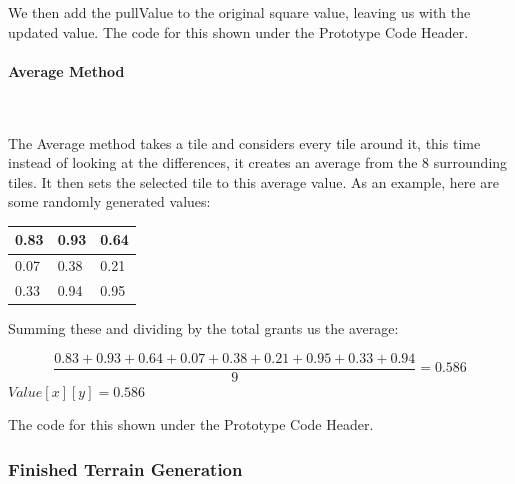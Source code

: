 \begin{flushleft}
            \vspace{0.5cm}

            We then add the pullValue to the original square value, leaving us with the updated value. The code for 
            this shown under the Prototype Code Header.
            \vspace{0.5cm}

            \paragraph{Average Method} \mbox{} \\
            \vspace{0.25cm}

            The Average method takes a tile and considers every tile around it, this time instead of looking at the
            differences, it creates an average from the 8 surrounding tiles. It then sets the selected tile to this
            average value. As an example, here are some randomly generated values:

            \begin{center}
                \begin{tabular}{| C{0.75cm} | C{0.75cm} | C{0.75cm} |}
                     & 0.93 & 0.64 \\ [0.75cm]
                     & 0.38 & 0.21 \\ [0.75cm]
                     & 0.94 & 0.95 \\ [0.75cm]
                    \hline
                \end{tabular}
                \vspace{0.25cm}

                Summing these and dividing by the total grants us the average:

                \[
                \frac{0.83 + 0.93 + 0.64 + 0.07 + 0.38 + 0.21 + 0.95 + 0.33 + 0.94}{9} = 0.586
                \]
                $Value[x][y] = 0.586$
            \end{center}
            \vspace{0.25cm}

            The code for this shown under the Prototype Code Header.

            \vspace{1cm}


            \subsubsection{Finished Terrain Generation}
            \vspace{0.25cm}


\end{flushleft}
